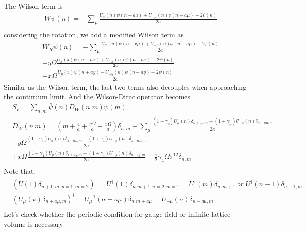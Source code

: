 The Wilson term is
\begin{equation}
\begin{split}
&W\psi (n)= -\sum _{\mu}\frac{U_{\mu}(n)\psi(n+a\mu)+U_{-\mu}(n)\psi(n-a\mu)-2\psi(n)}{2a}\\
\end{split}
\end{equation}
considering the rotation, we add a modified Wilson term as
\begin{equation}
\begin{split}
&W_R\psi (n)= -\sum _{\mu}\frac{U_{\mu}(n)\psi(n+a\mu)+U_{-\mu}(n)\psi(n-a\mu)-2\psi(n)}{2a}\\
&-y\Omega \frac{U_{x}(n)\psi(n+ax)+U_{-x}(n)\psi(n-ax)-2\psi(n)}{2a}\\
&+x\Omega \frac{U_{y}(n)\psi(n+ay)+U_{-y}(n)\psi(n-ay)-2\psi(n)}{2a}
\end{split}
\end{equation}
Similar as the Wilson term, the last two terms also decouples when approaching the continuum limit. And the Wilson-Dirac operator becomes
\begin{equation}
\begin{split}
&S_F=\sum _{n,m}\bar{\psi }(n) D_W(n|m) \psi(m)\\
&D_W(n|m)=\left(m+\frac{4}{a}+\frac{y\Omega}{a}-\frac{x\Omega}{a}\right)\delta _{n,m}-\sum _{\mu}\frac{(1-\gamma _{\mu})U_{\mu}(n)\delta _{n+a\mu,m}+(1+\gamma _{\mu})U_{-\mu}(n)\delta _{n-a\mu,m}}{2a}\\
&-y\Omega \frac{(1-\gamma _4)U_{x}(n)\delta _{n+ax,m}+(1+\gamma _4)U_{-x}(n)\delta _{n-ax,m}}{2a}\\
&+x\Omega \frac{(1-\gamma _4)U_{y}(n)\delta _{n+ay,m}+(1+\gamma _4)U_{-y}(n)\delta _{n-ay,m}}{2a} -\frac{i}{2}\gamma _4\Omega \sigma ^{12}\delta _{n,m}\\
\end{split}
\end{equation}
Note that,
\begin{equation}
\begin{split}
&\left(U(1)\delta _{n+1,m,n=1,m=2}\right)^{\dagger}=U^{\dagger}(1)\delta _{n,m+1,n=2,m=1}=U^{\dagger}(m)\delta _{n,m+1}\;or\;U^{\dagger}(n-1)\delta _{n-1,m}\\
&\left(U_{\mu}(n)\delta _{n+a\mu,m}\right)^{\dagger}=U_{\mu}^{-1}(n-a\mu)\delta _{n,m+a\mu}=U_{-\mu}(n)\delta _{n-a\mu,m}\\
\end{split}
\end{equation}
Let's check whether the periodic condition for gauge field or infinite lattice volume is necessary
